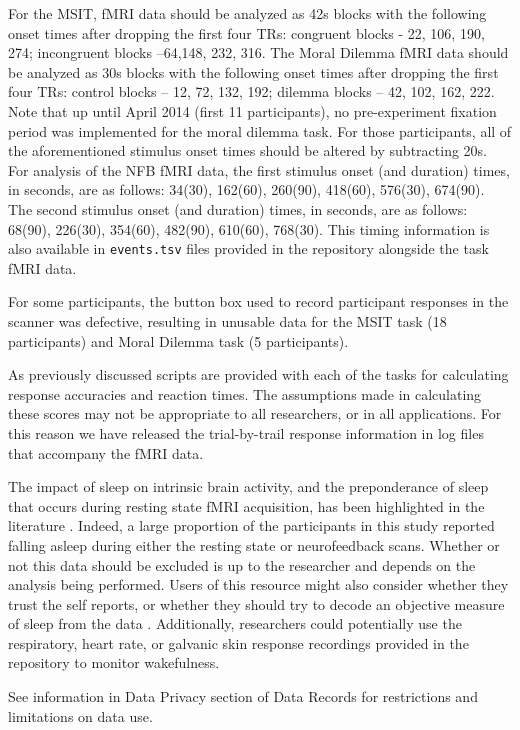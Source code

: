 For the MSIT, fMRI data should be analyzed as 42s blocks with the following onset times after dropping the first four TRs: congruent blocks - 22, 106, 190, 274; incongruent blocks –64,148, 232, 316. The Moral Dilemma fMRI data should be analyzed as 30s blocks with the following onset times after dropping the first four TRs: control blocks – 12, 72, 132, 192; dilemma blocks – 42, 102, 162, 222. Note that up until April 2014 (first 11 participants), no pre-experiment fixation period was implemented for the moral dilemma task. For those participants, all of the aforementioned stimulus onset times should be altered by subtracting 20s. For analysis of the NFB fMRI data, the first stimulus onset (and duration) times, in seconds, are as follows: 34(30), 162(60), 260(90), 418(60), 576(30), 674(90). The second stimulus onset (and duration) times, in seconds, are as follows: 68(90), 226(30), 354(60), 482(90), 610(60), 768(30). This timing information is also available in \texttt{events.tsv} files provided in the repository alongside the task fMRI data.

For some participants, the button box used to record participant responses in the scanner was defective, resulting in unusable data for the MSIT task (18 participants) and Moral Dilemma task (5 participants).

As previously discussed scripts are provided with each of the tasks for calculating response accuracies and reaction times. The assumptions made in calculating these scores may not be appropriate to all researchers, or in all applications. For this reason we have released the trial-by-trail response information in log files that accompany the fMRI data.

The  impact of sleep on intrinsic brain activity, and the preponderance of sleep that occurs during resting state fMRI acquisition, has been highlighted in the literature \cite{Duyn2011,Tagliazucchi2014}. Indeed, a large proportion of the participants in this study reported falling asleep during either the resting state or neurofeedback scans. Whether or not this data should be excluded is up to the researcher and depends on the analysis being performed. Users of this resource might also consider whether they trust the self reports, or whether they should try to decode an objective measure of sleep from the data \cite{Tagliazucchi2014}. Additionally, researchers could potentially use the respiratory, heart rate, or galvanic skin response recordings provided in the repository to monitor wakefulness.

See information in Data Privacy section of Data Records for restrictions and limitations on data use.

